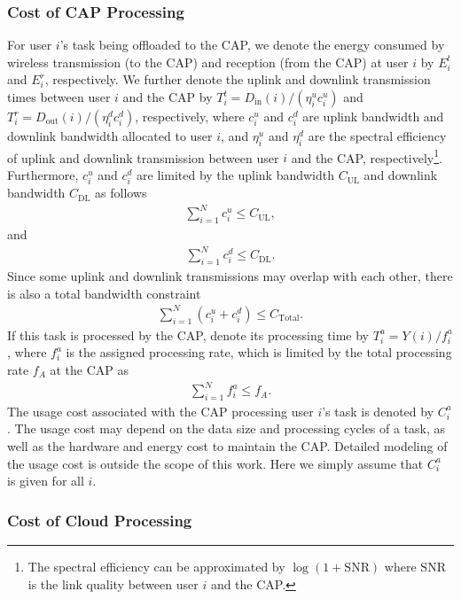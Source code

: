 \documentclass[10pt,journal,compsoc]{IEEEtran}
\begin{document}
\subsubsection{Cost of CAP Processing}
For user $i$'s task being offloaded to the CAP, we denote the energy
consumed by wireless transmission (to the CAP) and reception (from
the CAP) at user $i$ by $E^t_{i}$ and $E^r_{i}$, respectively. We
further denote the uplink and downlink transmission times between
user $i$ and the CAP by
$T^t_{i}=D_{{\textrm{in}}}(i)/(\eta^u_{i}c^u_{i})$ and
$T^r_{i}=D_{{\textrm{out}}}(i)/(\eta^d_{i}c^d_{i})$, respectively,
where $c^u_{i}$ and $c^d_{i}$ are uplink bandwidth and downlink
bandwidth allocated to user $i$, and $\eta_i^u$ and $\eta_i^d$ are
the spectral efficiency of uplink and downlink transmission between
user $i$ and the CAP, respectively\footnote{The spectral efficiency
can be approximated by $\log(1+\mathrm{SNR})$ where $\mathrm{SNR}$
is the link quality between user $i$ and the CAP.}. Furthermore,
$c^u_{i}$ and $c^d_{i}$ are limited by the uplink bandwidth
$C_{\textrm{UL}}$ and downlink bandwidth $C_{\textrm{DL}}$ as
follows
\begin{align}\label{b}
\sum_{i=1}^Nc^u_{i}\leq C_{\mathrm{UL}},
\end{align}
and
\begin{align}\label{c}
\sum_{i=1}^Nc^d_{i}\leq C_{\mathrm{DL}}.
\end{align}
Since some uplink and downlink transmissions may overlap with each
other, there is also a total bandwidth constraint
\begin{align}\label{cap_total}
\sum_{i=1}^N(c^u_{i}+c^d_{i})\leq
C_{\mathrm{Total}}.
\end{align}
If this task is processed by the CAP, denote its processing time by
$T^a_{i}=Y(i)/f^a_i$, where $f^a_i$ is the assigned processing rate,
which is limited by the total processing rate $f_A$ at the CAP as
\begin{align}\label{d}
\sum_{i=1}^Nf^a_{i}\leq f_{A}.
\end{align}
The usage cost associated with the CAP processing user $i$'s task is
denoted by $C_i^a$. The usage cost may depend on the data size and
processing cycles of a task, as well as the hardware and energy cost
to maintain the CAP. Detailed modeling of the usage cost is outside
the scope of this work. Here we simply assume that $C^a_{i}$ is
given for all $i$.


\subsubsection{Cost of Cloud Processing}
\end{document}
